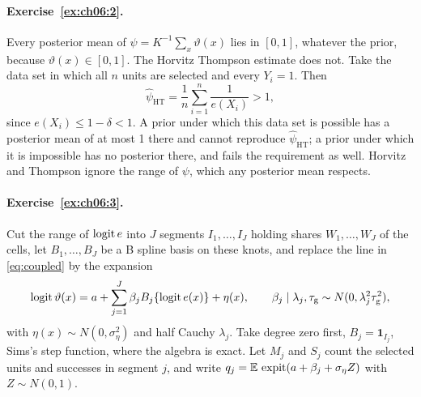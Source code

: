 \paragraph{Exercise~\ref{ex:ch06:2}.} Every posterior mean of $\psi = K^{-1}\sum_x\vartheta(x)$ lies in $[0, 1]$, whatever the prior, because $\vartheta(x) \in [0, 1]$. The Horvitz Thompson estimate does not. Take the data set in which all $n$ units are selected and every $Y_i = 1$. Then
\[
\hat\psi_{\mathrm{HT}} = \frac{1}{n}\sum_{i=1}^n \frac{1}{e(X_i)} > 1,
\]
since $e(X_i) \leq 1 - \delta < 1$. A prior under which this data set is possible has a posterior mean of at most 1 there and cannot reproduce $\hat\psi_{\mathrm{HT}}$; a prior under which it is impossible has no posterior there, and fails the requirement as well.  Horvitz and Thompson ignore the range of $\psi$, which any posterior mean respects.

\paragraph{Exercise~\ref{ex:ch06:3}.} Cut the range of $\operatorname{logit} e$ into $J$ segments $I_1, \ldots, I_J$ holding shares $W_1, \ldots, W_J$ of the cells, let $B_1, \ldots, B_J$ be a B spline basis on these knots, and replace the line in \eqref{eq:coupled} by the expansion
\[
\operatorname{logit}\vartheta(x) = a + \sum_{j=1}^J \beta_j B_j\{\operatorname{logit} e(x)\} + \eta(x), \qquad \beta_j \mid \lambda_j, \tau_{\mathrm{g}} \sim N(0, \lambda_j^2\tau_{\mathrm{g}}^2),
\]
with $\eta(x) \sim N(0, \sigma_\eta^2)$ and half Cauchy $\lambda_j$. Take degree zero first, $B_j = \mathbf 1_{I_j}$, Sims's step function, where the algebra is exact. Let $M_j$ and $S_j$ count the selected units and successes in segment $j$, and write $q_j = \mathbb{E}\,\operatorname{expit}(a + \beta_j + \sigma_\eta Z)$ with $Z \sim N(0, 1)$.

